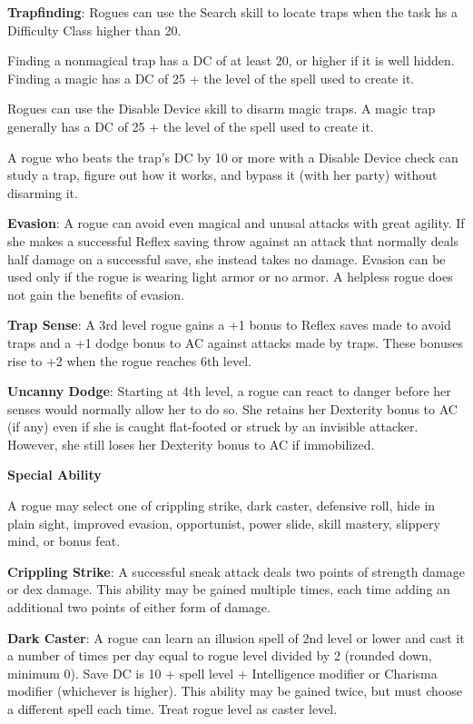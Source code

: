 \textbf{Trapfinding}: Rogues can use the Search skill to locate traps when the task hs a Difficulty Class higher than 20. 

Finding a nonmagical trap has a DC of at least 20, or higher if it is well hidden. Finding a magic has a DC of 25 + the level of the spell used to create it.

Rogues can use the Disable Device skill to disarm magic traps. A magic trap generally has a DC of 25 + the level of the spell used to create it.

A rogue who beats the trap's DC by 10 or more with a Disable Device check can study a trap, figure out how it works, and bypass it (with her party) without disarming it.

\textbf{Evasion}: A rogue can avoid even magical and unusal attacks with great agility. If she makes a successful Reflex saving throw against an attack that normally deals half damage on a successful save, she instead takes no damage. Evasion can be used only if the rogue is wearing light armor or no armor. A helpless rogue does not gain the benefits of evasion.

\textbf{Trap Sense}: A 3rd level rogue gains a +1 bonus to Reflex saves made to avoid traps and a +1 dodge bonus to AC against attacks made by traps. These bonuses rise to +2 when the rogue reaches 6th level.

\textbf{Uncanny Dodge}: Starting at 4th level, a rogue can react to danger before her senses would normally allow her to do so. She retains her Dexterity bonus to AC (if any) even if she is caught flat-footed or struck by an invisible attacker. However, she still loses her Dexterity bonus to AC if immobilized.

\textbf{\large{Special Ability}}

A rogue may select one of crippling strike, dark caster, defensive roll, hide in plain sight, improved evasion, opportunist, power slide, skill mastery, slippery mind, or bonus feat.

\textbf{Crippling Strike}: A successful sneak attack deals two points of strength damage or dex damage. This ability may be gained multiple times, each time adding an additional two points of either form of damage.

\textbf{Dark Caster}: A rogue can learn an illusion spell of 2nd level or lower and cast it a number of times per day equal to rogue level divided by 2 (rounded down, minimum 0). Save DC is 10 + spell level + Intelligence modifier or Charisma modifier (whichever is higher). This ability may be gained twice, but must choose a different spell each time. Treat rogue level as caster level.

